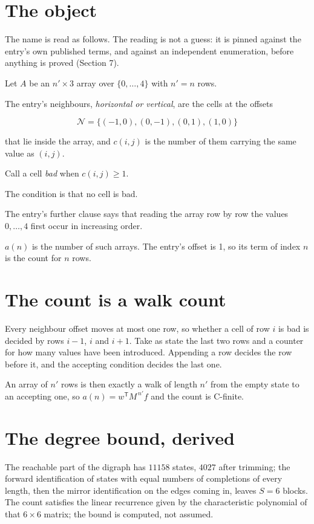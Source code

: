 \documentclass[11pt]{article}
\theoremstyle{definition}
\begin{document}
\section{The object}

The name is read as follows. The reading is not a guess: it is pinned against the entry's own published terms, and against an independent enumeration, before anything is proved (Section 7).

Let $A$ be an $n' \times 3$ array over $\{0,\dots,4\}$ with $n' = n$ rows.

The entry's neighbours, {\itshape horizontal or vertical}, are the cells at the offsets

\[\mathcal{N} = \{(-1,0), (0,-1), (0,1), (1,0)\}\]

that lie inside the array, and $c(i,j)$ is the number of them carrying the same value as $(i,j)$.

Call a cell {\itshape bad} when $c(i,j) \ge 1$.

The condition is that no cell is bad.

The entry's further clause says that reading the array row by row the values $0,\dots,4$ first occur in increasing order.

$a(n)$ is the number of such arrays. The entry's offset is 1, so its term of index $n$ is the count for $n$ rows.

\section{The count is a walk count}

Every neighbour offset moves at most one row, so whether a cell of row $i$ is bad is decided by rows $i-1$, $i$ and $i+1$. Take as state the last two rows and a counter for how many values have been introduced. Appending a row decides the row before it, and the accepting condition decides the last one.

An array of $n'$ rows is then exactly a walk of length $n'$ from the empty state to an accepting one, so $a(n) = w^{\mathsf T}M^{\,n'}f$ and the count is C-finite.

\section{The degree bound, derived}

The reachable part of the digraph has $11158$ states, $4027$ after trimming; the forward identification of states with equal numbers of completions of every length, then the mirror identification on the edges coming in, leaves $S = 6$ blocks. The count satisfies the linear recurrence given by the characteristic polynomial of that $6\times6$ matrix; the bound is computed, not assumed.
\end{document}
